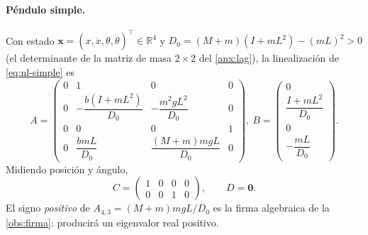 \documentclass[11pt,letterpaper]{article}
\theoremstyle{definition}
\theoremstyle{plain}
\theoremstyle{remark}
\newcommand{\R}{\mathbb{R}}
\newcommand{\xv}{\bm{x}}
\begin{document}
\paragraph{Péndulo simple.} Con estado
$\xv=(x,\dot x,\theta,\dot\theta)^\top\in\R^4$ y
$D_0=(M{+}m)(I{+}mL^2)-(mL)^2>0$ (el determinante de la matriz de masa
$2\times2$ del \cref{anx:lag}), la linealización de \cref{eq:nl-simple}
es
\begin{equation}\label{eq:AB-simple}
A=\!\begin{pmatrix}
0&1&0&0\\[2pt]
0&-\dfrac{b(I{+}mL^2)}{D_0}&-\dfrac{m^2gL^2}{D_0}&0\\[8pt]
0&0&0&1\\[2pt]
0&\dfrac{bmL}{D_0}&\dfrac{(M{+}m)mgL}{D_0}&0
\end{pmatrix},\
B=\!\begin{pmatrix}
0\\[2pt]\dfrac{I{+}mL^2}{D_0}\\[8pt]0\\[2pt]-\dfrac{mL}{D_0}
\end{pmatrix}.
\end{equation}
Midiendo posición y ángulo,
\begin{equation}\label{eq:C-simple}
  C=\begin{pmatrix}1&0&0&0\\0&0&1&0\end{pmatrix},\qquad D=\bm 0.
\end{equation}
El signo \emph{positivo} de $A_{4,3}=(M{+}m)mgL/D_0$ es la firma
algebraica de la \cref{obs:firma}: producirá un eigenvalor real positivo.
\end{document}
